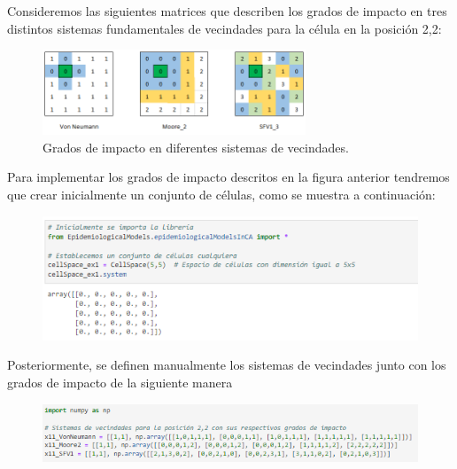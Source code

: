 \begin{example}
Consideremos las siguientes matrices que describen los grados de impacto en tres distintos sistemas fundamentales de vecindades para la célula en la posición 2,2:

\begin{figure}[h]
  \centering
    \includegraphics[width=0.7\textwidth]{Imagenes/ex315.PNG}
  \caption{Grados de impacto en diferentes sistemas de vecindades.}
  \label{fig:gradoImpacto}
\end{figure}

\newpage

Para implementar los grados de impacto descritos en la figura anterior tendremos que crear inicialmente un conjunto de células, como se muestra a continuación:

\begin{figure}[h]
  \centering
    \includegraphics[width=1\textwidth]{Imagenes/interaccionesSociales1.png}
\end{figure}

Posteriormente, se definen manualmente los sistemas de vecindades junto con los grados de impacto de la siguiente manera

\begin{figure}[h]
  \centering
    \includegraphics[width=1\textwidth]{Imagenes/interaccionesSociales2.png}
\end{figure}


\end{example}
